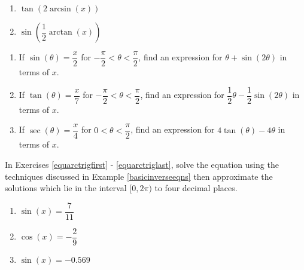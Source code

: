 \begin{multicols}{2}

\begin{enumerate}

\setcounter{enumi}{\value{HW}}

\item $\tan \left( 2\arcsin(x) \right)$ 
\item $\sin \left( \dfrac{1}{2}\arctan(x) \right)$  \label{rewritelast}

\setcounter{HW}{\value{enumi}}

\end{enumerate}

\end{multicols}

\begin{enumerate}

\setcounter{enumi}{\value{HW}}

\item If $\sin(\theta) = \dfrac{x}{2}$ for $-\dfrac{\pi}{2} < \theta < \dfrac{\pi}{2}$, find an expression for $\theta + \sin(2\theta)$ in terms of $x$.

\item If $\tan(\theta) = \dfrac{x}{7}$ for $-\dfrac{\pi}{2} < \theta < \dfrac{\pi}{2}$, find an expression for $\dfrac{1}{2}\theta - \dfrac{1}{2}\sin(2\theta)$ in terms of $x$.

\item If $\sec(\theta) = \dfrac{x}{4}$ for $0 < \theta < \dfrac{\pi}{2}$, find an expression for $4\tan(\theta) - 4\theta$ in terms of $x$.

\setcounter{HW}{\value{enumi}}

\end{enumerate}

In Exercises \ref{equarctrigfirst} - \ref{equarctriglast}, solve the equation using the techniques discussed in Example \ref{basicinverseeqns} then approximate the solutions which lie in the interval $[0, 2\pi)$ to four decimal places.

\begin{multicols}{3}

\begin{enumerate}

\setcounter{enumi}{\value{HW}}

\item $\sin(x) = \dfrac{7}{11}$ \label{equarctrigfirst}
\item $\cos(x) = -\dfrac{2}{9}$
\item $\sin(x) = -0.569$ 

\setcounter{HW}{\value{enumi}}

\end{enumerate}

\end{multicols}

